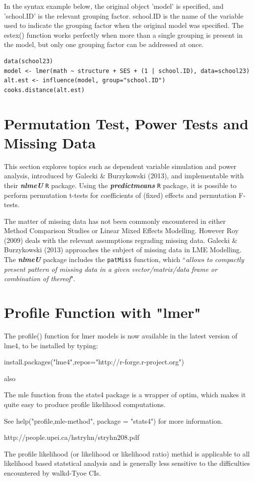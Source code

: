 \documentclass[12pt, a4paper]{report}
\begin{document}
In the syntax example below, the original object 'model' is specified, and 'school.ID' is the relevant grouping factor. school.ID is the name of the variable used to indicate the grouping factor when the original model was specified. The estex() function works perfectly when more than a single grouping is present in the model, but only one grouping factor can be addressed at once.

\begin{verbatim}
data(school23)
model <- lmer(math ~ structure + SES + (1 | school.ID), data=school23)
alt.est <- influence(model, group="school.ID")
cooks.distance(alt.est)
\end{verbatim}

\section{Permutation Test, Power Tests and Missing Data }

This section explores topics such as dependent variable simulation and power analysis, introduced by Galecki \& Burzykowski (2013), and implementable with their \textbf{\textit{nlmeU}} \texttt{R} package.
Using the \textbf{\textit{predictmeans}} \texttt{R} package, it is possible to perform permutation t-tests for coefficients of (fixed) effects and permutation F-tests.

The matter of missing data has not been commonly encountered in either Method Comparison Studies or Linear Mixed Effects Modelling. However Roy (2009) deals with the relevant assumptions regrading missing data. Galecki \& Burzykowski (2013) approaches the subject of missing data in LME Modelling. The \textbf{\textit{nlmeU}} package includes the \texttt{patMiss} function, which ``\textit{allows to compactly present pattern of missing data in a given vector/matrix/data
	frame or combination of thereof}".


\tableofcontents


\section{Profile Function with "lmer"}

The profile() function for lmer models is now available in the latest version of lme4, to be installed by typing:

install.packages("lme4",repos="http://r-forge.r-project.org")

also

The mle function from the stats4 package is a wrapper of optim, which makes it quite easy to produce 
profile likelihood computations. 

See help("profile,mle-method", package = "stats4") for more information.


http://people.upei.ca/hstryhn/stryhn208.pdf

The profile likelihood (or likelihood or likelihood ratio) methid is applicable to 
all likelihood based statstical analysis and is generally less sensitive to the difficulties
encountered by walkd-Tyoe CIs.





\end{document}
